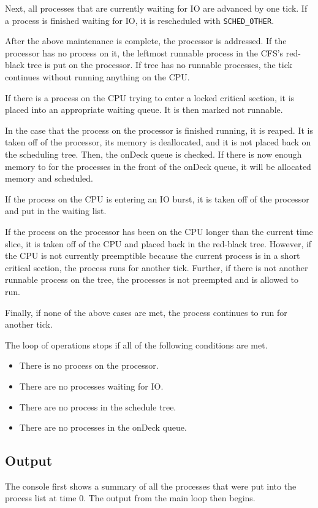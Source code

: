 \documentclass[12pt]{article}
\begin{document}
Next, all processes that are currently waiting for IO are advanced by one tick. If a process is finished waiting for IO, it is rescheduled with \lstinline|SCHED_OTHER|.

After the above maintenance is complete, the processor is addressed. If the processor has no process on it, the leftmost runnable process in the CFS's red-black tree is put on the processor. If tree has no runnable processes, the tick continues without running anything on the CPU.

If there is a process on the CPU trying to enter a locked critical section, it is placed into an appropriate waiting queue. It is then marked not runnable.

In the case that the process on the processor is finished running, it is reaped. It is taken off of the processor, its memory is deallocated, and it is not placed back on the scheduling tree. Then, the onDeck queue is checked. If there is now enough memory to for the processes in the front of the onDeck queue, it will be allocated memory and scheduled.

If the process on the CPU is entering an IO burst, it is taken off of the processor and put in the waiting list.

If the process on the processor has been on the CPU longer than the current time slice, it is taken off of the CPU and placed back in the red-black tree. However, if the CPU is not currently preemptible because the current process is in a short critical section, the process runs for another tick. Further, if there is not another runnable process on the tree, the processes is not preempted and is allowed to run.

Finally, if none of the above cases are met, the process continues to run for another tick.

The loop of operations stops if all of the following conditions are met.

\singlespacing
\begin{itemize}
\item There is no process on the processor.
\item There are no processes waiting for IO.
\item There are no process in the schedule tree.
\item There are no processes in the onDeck queue.
\end{itemize}
\doublespacing

\subsection{Output}
The console first shows a summary of all the processes that were put into the process list at time 0. The output from the main loop then begins.
\end{document}
